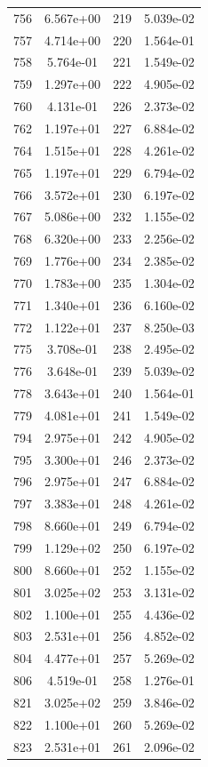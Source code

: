 \documentclass[12pt]{article}
\begin{document}
\begin{longtable}{@{}cccc@{}}
756 & 6.567e+00 & 219 & 5.039e-02 \\
757 & 4.714e+00 & 220 & 1.564e-01 \\
758 & 5.764e-01 & 221 & 1.549e-02 \\
759 & 1.297e+00 & 222 & 4.905e-02 \\
760 & 4.131e-01 & 226 & 2.373e-02 \\
762 & 1.197e+01 & 227 & 6.884e-02 \\
764 & 1.515e+01 & 228 & 4.261e-02 \\
765 & 1.197e+01 & 229 & 6.794e-02 \\
766 & 3.572e+01 & 230 & 6.197e-02 \\
767 & 5.086e+00 & 232 & 1.155e-02 \\
768 & 6.320e+00 & 233 & 2.256e-02 \\
769 & 1.776e+00 & 234 & 2.385e-02 \\
770 & 1.783e+00 & 235 & 1.304e-02 \\
771 & 1.340e+01 & 236 & 6.160e-02 \\
772 & 1.122e+01 & 237 & 8.250e-03 \\
775 & 3.708e-01 & 238 & 2.495e-02 \\
776 & 3.648e-01 & 239 & 5.039e-02 \\
778 & 3.643e+01 & 240 & 1.564e-01 \\
779 & 4.081e+01 & 241 & 1.549e-02 \\
794 & 2.975e+01 & 242 & 4.905e-02 \\
795 & 3.300e+01 & 246 & 2.373e-02 \\
796 & 2.975e+01 & 247 & 6.884e-02 \\
797 & 3.383e+01 & 248 & 4.261e-02 \\
798 & 8.660e+01 & 249 & 6.794e-02 \\
799 & 1.129e+02 & 250 & 6.197e-02 \\
800 & 8.660e+01 & 252 & 1.155e-02 \\
801 & 3.025e+02 & 253 & 3.131e-02 \\
802 & 1.100e+01 & 255 & 4.436e-02 \\
803 & 2.531e+01 & 256 & 4.852e-02 \\
804 & 4.477e+01 & 257 & 5.269e-02 \\
806 & 4.519e-01 & 258 & 1.276e-01 \\
821 & 3.025e+02 & 259 & 3.846e-02 \\
822 & 1.100e+01 & 260 & 5.269e-02 \\
823 & 2.531e+01 & 261 & 2.096e-02 \\

\end{longtable}
\end{document}
